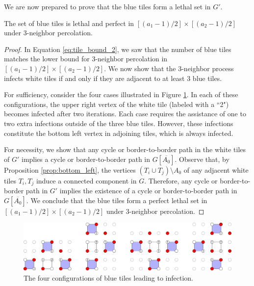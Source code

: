 We are now prepared to prove that the blue tiles form a lethal set in $G'$.

\begin{lem}
\label{lem:blue_lethal}
The set of blue tiles is lethal and perfect in $[(a_1-1)/2] \times [(a_2-1)/2]$ under 3-neighbor percolation.
\end{lem}

\begin{proof}
In Equation \ref{eq:tile_bound_2}, we saw that the number of blue tiles matches the lower bound for 3-neighbor percolation in $[(a_1-1)/2] \times [(a_2-1)/2]$. We now show that the 3-neighbor process infects white tiles if and only if they are adjacent to at least 3 blue tiles.

For sufficiency, consider the four cases illustrated in Figure \ref{fig:tile_infection}. In each of these configurations, the upper right vertex of the white tile (labeled with a ``2") becomes infected after two iterations. Each case requires the assistance of one to two extra infections outside of the three blue tiles. However, these infections constitute the bottom left vertex in adjoining tiles, which is always infected.

For necessity, we show that any cycle or border-to-border path in the white tiles of $G'$ implies a cycle or border-to-border path in $G[\overline{A_0}]$. Observe that, by Proposition \ref{prop:bottom_left}, the vertices $(T_i \cup T_{j}) \setminus A_0$ of any adjacent white tiles $T_i, T_j$ induce a connected component in $G$. Therefore, any cycle or border-to-border path in $G'$ implies the existence of a cycle or border-to-border path in $G[\overline{A_0}]$. We conclude that the blue tiles form a perfect lethal set in $[(a_1-1)/2] \times [(a_2-1)/2]$ under 3-neighbor percolation.
\end{proof}

\begin{figure}[]
\centering
\includegraphics[width=\textwidth]{figures/6/tile_infection.pdf}
\caption{The four configurations of blue tiles leading to infection.}
\label{fig:tile_infection}
\end{figure} 

